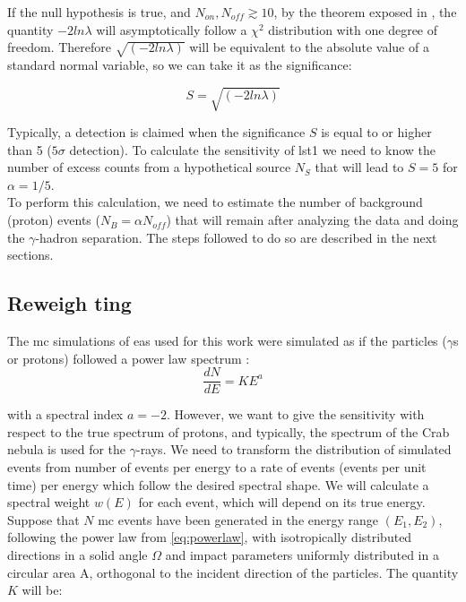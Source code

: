 \documentclass[main.tex]{subfiles}
\begin{document}
If the null hypothesis is true, and $N_{on}, N_{off} \gtrsim 10$, by the theorem exposed in \cite{1983LiMa}, the quantity $-2ln\lambda$ will asymptotically follow a $\chi^2$ distribution with one degree of freedom. Therefore $\sqrt{(-2ln\lambda)}$ will be equivalent to the absolute value of a standard normal variable, so we can take it as the significance:

\begin{equation}
  S = \sqrt{(-2ln\lambda)}
\end{equation}

Typically, a detection is claimed when the significance $S$ is equal to or higher than 5 ($5\sigma$ detection). To calculate the sensitivity of \gls{lst}1 we need to know the number of excess counts from a hypothetical source $N_{S}$ that will lead to $S=5$ for $\alpha=1/5$. \\
To perform this calculation, we need to estimate the number of background (proton) events ($N_{B} = \alpha N_{off}$) that will remain after analyzing the data and doing the $\gamma$-hadron separation. The steps followed to do so are described in the next sections.

\subsection{Reweigh ting}

The \gls{mc} simulations of \gls{eas} used for this work were simulated as if the particles ($\gamma$s or protons) followed a power law spectrum
:
\begin{equation} \label{eq:powerlaw}
\frac{dN}{dE} = K E^{a}
\end{equation}

with a spectral index $a=-2$. However, we want to give the sensitivity with respect to the true spectrum of protons, and typically, the spectrum of the Crab nebula is used for the $\gamma$-rays. We need to transform the distribution of simulated events from number of events per energy to a rate of events (events per unit time) per energy which follow the desired spectral shape. We will calculate a spectral weight $w(E)$ for each event, which will depend on its true energy.\\
Suppose that $N$ \gls{mc} events have been generated in the energy range $(E_1,E_2)$, following the power law from \ref{eq:powerlaw}, with isotropically distributed directions in a solid angle $\Omega$ and impact parameters uniformly distributed in a circular area A, orthogonal to the incident direction of the particles.
The quantity $K$ will be:
\end{document}
